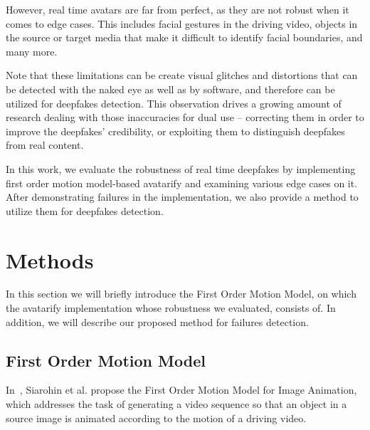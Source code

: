 \documentclass[english,12pt]{article}
\begin{document}
However, real time avatars are far from perfect, as they are not robust when it comes to edge cases.
This includes facial gestures in the driving video, objects in the source or target media that make it
difficult to identify facial boundaries, and many more.


Note that these limitations can be create visual glitches and distortions that can be detected with the
naked eye as well as by software, and therefore can be utilized for deepfakes detection. This observation
drives a growing amount of research dealing with those inaccuracies for dual use -- correcting them in
order to improve the deepfakes' credibility, or exploiting them to distinguish deepfakes from real content.

In this work, we evaluate the robustness of real time deepfakes by implementing first order motion
model-based avatarify and examining various edge cases on it. After demonstrating failures in the
implementation, we also provide a method to utilize them for deepfakes detection.



\section{Methods} \label{methods}

In this section we will briefly introduce the First Order Motion Model, on which the avatarify implementation
whose robustness we evaluated, consists of. In addition, we will describe our proposed method for failures detection.

\subsection{First Order Motion Model}


In~\cite{DBLP:journals/corr/abs-2003-00196}, Siarohin et al. propose the First Order Motion Model for Image
Animation, which addresses the task of generating a video sequence so that an object in a source image
is animated according to the motion of a driving video.
\end{document}
